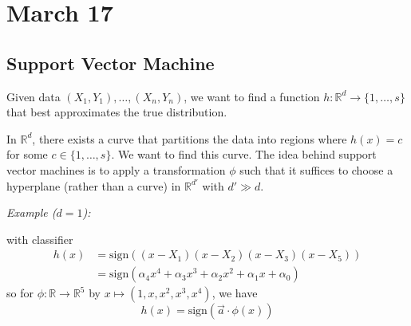 \documentclass[12pt]{report}
\newcommand{\R}{\mathbb{R}}
\begin{document}
\section{March 17}
\subsection{Support Vector Machine}

Given data $(X_1, Y_1), \dots, (X_n, Y_n)$, we want to find a function $h: \R^d \to \{1, \dots, s\}$ that best approximates the true distribution.

In $\R^d$, there exists a curve that partitions the data into regions where $h(x) = c$ for some $c \in \{1, \dots, s\}$. We want to find this curve. The idea behind support vector machines is to apply a transformation $\phi$ such that it suffices to choose a hyperplane (rather than a curve) in $\R^{d'}$ with $d' \gg d$.

\emph{Example ($d=1$):}

\begin{center}
\end{center}
with classifier
\begin{align*}
    h(x) & = \text{sign}((x - X_1)(x - X_2)(x-X_3)(x-X_5))                                    \\
         & =  \text{sign}(\alpha_4 x^4 + \alpha_3 x^3 + \alpha_2 x^2 + \alpha_1 x + \alpha_0)
\end{align*}
so for $\phi: \R \to \R^5$ by $x \mapsto (1, x, x^2, x^3, x^4)$, we have
\[h(x) = \text{sign}(\vec a \cdot \phi(x))\]
\end{document}
